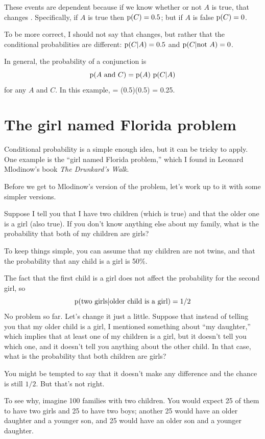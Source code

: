 \documentclass[12pt]{book}
\begin{document}
These events are dependent because if we know whether or not $A$ is
true, that changes .  Specifically, if $A$ is true then $\mathrm{p}(C)
= 0.5$; but if $A$ is false $\mathrm{p}(C) = 0$.

To be more correct, I should not say that  changes, but
rather that the conditional probabilities are different: $\mathrm{p}(C|A) = 0.5$
and $\mathrm{p}(C| \mathrm{not}~ A) = 0$.

In general, the probability of a conjunction is
%
\[ \mathrm{p}(A ~\mathrm{and}~ C) = \mathrm{p}(A)~\mathrm{p}(C|A) \]
%
for any $A$ and $C$.  In this example,  = (0.5)(0.5) = 0.25.


\section{The girl named Florida problem}

Conditional probability is a simple enough idea, but it can be
tricky to apply.  One example is the ``girl named Florida problem,''
which I found in Leonard Mlodinow's book {\it The Drunkard's Walk}.

Before we get to Mlodinow's version of the problem, let's work
up to it with some simpler versions.

Suppose I tell you that I have two children (which is true) and
that the older one is a girl (also true).  If you don't know anything
else about my family, what is the probability that both of
my children are girls?

To keep things simple, you can assume that my children are not twins,
and that the probability that any child is a girl is 50\%.

The fact that the first child is a girl does not affect the probability
for the second girl, so
%
\[ \mathrm{p}(\mbox{two girls} | \mbox{older child is a girl}) = 1/2 \]
%
No problem so far.  Let's change it just a little.  Suppose that instead
of telling you that my older child is a girl, I mentioned something
about ``my daughter,'' which implies that at least one of my children
is a girl, but it doesn't tell you which one, and it doesn't tell
you anything about the other child.  In that case, what is the probability
that both children are girls?

You might be tempted to say that it doesn't make any difference and
the chance is still $1/2$.  But that's not right.

To see why, imagine 100 families with two children.
You would expect 25 of them to have two girls and 25 to have two
boys; another 25 would have an older daughter and a younger son,
and 25 would have an older son and a younger daughter.
\end{document}
